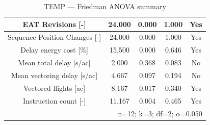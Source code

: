 \begin{table}[htbp]
\caption{TEMP — Friedman ANOVA summary}
\begin{center}
\footnotesize
\setlength{\tabcolsep}{3pt}
\renewcommand{\arraystretch}{1.000}
\begin{tabular}{|c|c|c|c|c|}
\hline
EAT Revisions [-] & 24.000 & 0.000 & 1.000 & Yes \\
\hline
Sequence Position Changes [-] & 24.000 & 0.000 & 1.000 & Yes \\
\hline
Delay energy cost [\%] & 15.500 & 0.000 & 0.646 & Yes \\
\hline
Mean total delay [s/ac] & 2.000 & 0.368 & 0.083 & No \\
\hline
Mean vectoring delay [s/ac] & 4.667 & 0.097 & 0.194 & No \\
\hline
Vectored flights [ac] & 8.167 & 0.017 & 0.340 & Yes \\
\hline
Instruction count [-] & 11.167 & 0.004 & 0.465 & Yes \\
\hline
\multicolumn{5}{r}{n=12; k=3; df=2; $\alpha$=0.050}\\
\end{tabular}
\label{tab:temp\_friedman}
\end{center}
\end{table}